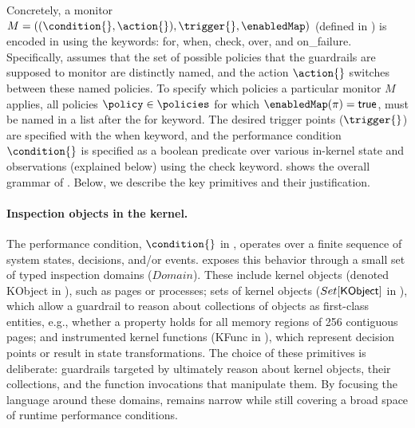 Concretely, a monitor $M=((\condition{},\action{}),\trigger{},\enabledMap)$ (defined in ) is encoded in \lang using the keywords: {\sf for}, {\sf when}, {\sf check}, {\sf over}, and {\sf on_failure}.
Specifically, \lang assumes that the set of possible policies that the guardrails are supposed to monitor are distinctly named, and the action $\action{}$ switches between these named policies. 
To specify which policies a particular monitor $M$ applies, all policies $\policy \in \policies$ for which $\enabledMap(\pi) = {\sf true}$, must be named in a list after the {\sf for} keyword.
The desired trigger points ($\trigger{}$) are specified with the {\sf when} keyword, and the performance condition $\condition{}$ is specified as a boolean predicate over various in-kernel state and observations (explained below) using the {\sf check} keyword.
 shows the overall grammar of \lang.
Below, we describe the key primitives and their justification.

\paragraph{Inspection objects in the kernel.}
The performance condition, $\condition{}$ in , operates over a finite sequence of system states, decisions, and/or events.
\lang exposes this behavior through a small set of typed inspection domains ($Domain$).
These include kernel objects (denoted {\sf KObject} in ), such as pages or processes; sets of kernel objects ($Set[{\sf KObject}]$ in ), which allow a guardrail to reason about collections of objects as first-class entities, e.g., whether a property holds for all memory regions of 256 contiguous pages; and instrumented kernel functions ({\sf KFunc} in ), which represent decision points or result in state transformations.
The choice of these primitives is deliberate: guardrails targeted by \lang ultimately reason about kernel objects, their collections, and the function invocations that manipulate them. By focusing the language around these domains, \lang remains narrow while still covering a broad space of runtime performance conditions.

